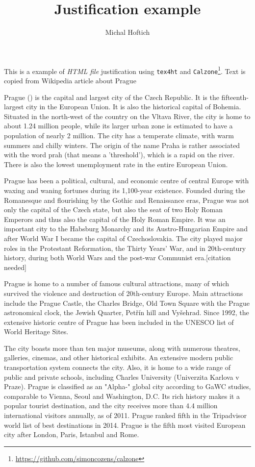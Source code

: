 \documentclass{article}
\title{Justification example}
\author{Michal Hoftich}
\begin{document}
 

\maketitle

This is a example of \textit{HTML file} justification using \verb|tex4ht| and
\verb|Calzone|\footnote{\url{https://github.com/simoncozens/calzone}}. Text is
  copied from Wikipedia article about Prague

Prague () is the
capital and largest city of the Czech Republic. It is the fifteenth-largest
city in the European Union. It is also the historical capital of Bohemia.
Situated in the north-west of the country on the Vltava River, the city is home
to about 1.24 million people, while its larger urban zone is estimated to have
a population of nearly 2 million. The city has a temperate climate, with
warm summers and chilly winters. The origin of the name Praha is rather
associated with the word prah (that means a 'threshold'), which is a rapid on
the river. There is also the lowest unemployment rate in the
entire European Union.

Prague has been a political, cultural, and economic centre of central Europe
with waxing and waning fortunes during its 1,100-year existence. Founded during
the Romanesque and flourishing by the Gothic and Renaissance eras, Prague was
not only the capital of the Czech state, but also the seat of two Holy Roman
Emperors and thus also the capital of the Holy Roman Empire. It was an
important city to the Habsburg Monarchy and its Austro-Hungarian Empire and
after World War I became the capital of Czechoslovakia. The city played major
roles in the Protestant Reformation, the Thirty Years' War, and in 20th-century
history, during both World Wars and the post-war Communist era.[citation
needed]

Prague is home to a number of famous cultural attractions, many of which
survived the violence and destruction of 20th-century Europe. Main attractions
include the Prague Castle, the Charles Bridge, Old Town Square with the Prague
astronomical clock, the Jewish Quarter, Petřín hill and Vyšehrad. Since 1992,
the extensive historic centre of Prague has been included in the UNESCO list of
World Heritage Sites.

The city boasts more than ten major museums, along with numerous theatres,
galleries, cinemas, and other historical exhibits. An extensive modern public
transportation system connects the city. Also, it is home to a wide range of
public and private schools, including Charles University (Univerzita Karlova v
Praze). Prague is classified as an "Alpha-" global city according to GaWC
studies, comparable to Vienna, Seoul and Washington, D.C. Its rich history
makes it a popular tourist destination, and the city receives more than 4.4
million international visitors annually, as of 2011. Prague ranked fifth in
the Tripadvisor world list of best destinations in 2014. Prague is the
fifth most visited European city after London, Paris, Istanbul and Rome.
\end{document}

